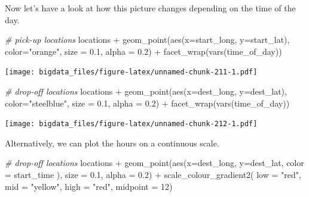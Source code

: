 \documentclass[
  12pt,
]{style/krantz}
\newenvironment{Shaded}{\begin{snugshade}}{\end{snugshade}}
\newcommand{\AttributeTok}[1]{\textcolor[rgb]{0.77,0.63,0.00}{#1}}
\newcommand{\CommentTok}[1]{\textcolor[rgb]{0.56,0.35,0.01}{\textit{#1}}}
\newcommand{\DecValTok}[1]{\textcolor[rgb]{0.00,0.00,0.81}{#1}}
\newcommand{\FloatTok}[1]{\textcolor[rgb]{0.00,0.00,0.81}{#1}}
\newcommand{\FunctionTok}[1]{\textcolor[rgb]{0.00,0.00,0.00}{#1}}
\newcommand{\NormalTok}[1]{#1}
\newcommand{\SpecialCharTok}[1]{\textcolor[rgb]{0.00,0.00,0.00}{#1}}
\newcommand{\StringTok}[1]{\textcolor[rgb]{0.31,0.60,0.02}{#1}}
\begin{document}
Now let's have a look at how this picture changes depending on the time of the day.

\begin{Shaded}
\begin{Highlighting}[]
\CommentTok{\# pick{-}up locations }
\NormalTok{locations }\SpecialCharTok{+}
     \FunctionTok{geom\_point}\NormalTok{(}\FunctionTok{aes}\NormalTok{(}\AttributeTok{x=}\NormalTok{start\_long, }\AttributeTok{y=}\NormalTok{start\_lat),}
                \AttributeTok{color=}\StringTok{"orange"}\NormalTok{,}
                \AttributeTok{size =} \FloatTok{0.1}\NormalTok{,}
                \AttributeTok{alpha =} \FloatTok{0.2}\NormalTok{) }\SpecialCharTok{+}
     \FunctionTok{facet\_wrap}\NormalTok{(}\FunctionTok{vars}\NormalTok{(time\_of\_day))}
\end{Highlighting}
\end{Shaded}

\texttt{[image: bigdata\_files/figure-latex/unnamed-chunk-211-1.pdf]}

\begin{Shaded}
\begin{Highlighting}[]
\CommentTok{\# drop{-}off locations }
\NormalTok{locations }\SpecialCharTok{+}
     \FunctionTok{geom\_point}\NormalTok{(}\FunctionTok{aes}\NormalTok{(}\AttributeTok{x=}\NormalTok{dest\_long, }\AttributeTok{y=}\NormalTok{dest\_lat),}
                \AttributeTok{color=}\StringTok{"steelblue"}\NormalTok{,}
                \AttributeTok{size =} \FloatTok{0.1}\NormalTok{,}
                \AttributeTok{alpha =} \FloatTok{0.2}\NormalTok{) }\SpecialCharTok{+}
     \FunctionTok{facet\_wrap}\NormalTok{(}\FunctionTok{vars}\NormalTok{(time\_of\_day))}
\end{Highlighting}
\end{Shaded}

\texttt{[image: bigdata\_files/figure-latex/unnamed-chunk-212-1.pdf]}

Alternatively, we can plot the hours on a continuous scale.

\begin{Shaded}
\begin{Highlighting}[]
\CommentTok{\# drop{-}off locations }
\NormalTok{locations }\SpecialCharTok{+}
     \FunctionTok{geom\_point}\NormalTok{(}\FunctionTok{aes}\NormalTok{(}\AttributeTok{x=}\NormalTok{dest\_long, }\AttributeTok{y=}\NormalTok{dest\_lat, }\AttributeTok{color =}\NormalTok{ start\_time ),}
                \AttributeTok{size =} \FloatTok{0.1}\NormalTok{,}
                \AttributeTok{alpha =} \FloatTok{0.2}\NormalTok{) }\SpecialCharTok{+}
     \FunctionTok{scale\_colour\_gradient2}\NormalTok{( }\AttributeTok{low =} \StringTok{"red"}\NormalTok{, }\AttributeTok{mid =} \StringTok{"yellow"}\NormalTok{, }\AttributeTok{high =} \StringTok{"red"}\NormalTok{,}
                             \AttributeTok{midpoint =} \DecValTok{12}\NormalTok{)}
\end{Highlighting}
\end{Shaded}
\end{document}
